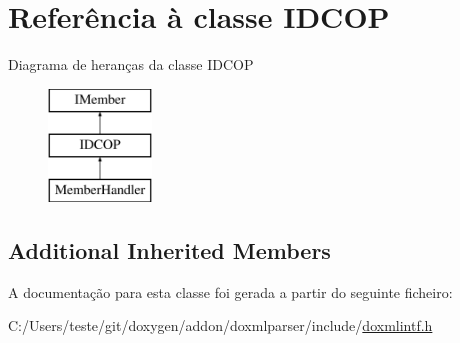 \hypertarget{class_i_d_c_o_p}{\section{Referência à classe I\-D\-C\-O\-P}
\label{class_i_d_c_o_p}
}
Diagrama de heranças da classe I\-D\-C\-O\-P\begin{figure}[H]
\begin{center}
\leavevmode
\includegraphics[height=3.000000cm]{class_i_d_c_o_p}
\end{center}
\end{figure}
\subsection*{Additional Inherited Members}


A documentação para esta classe foi gerada a partir do seguinte ficheiro\-:\begin{DoxyCompactItemize}
\item 
C\-:/\-Users/teste/git/doxygen/addon/doxmlparser/include/\hyperlink{include_2doxmlintf_8h}{doxmlintf.\-h}\end{DoxyCompactItemize}
